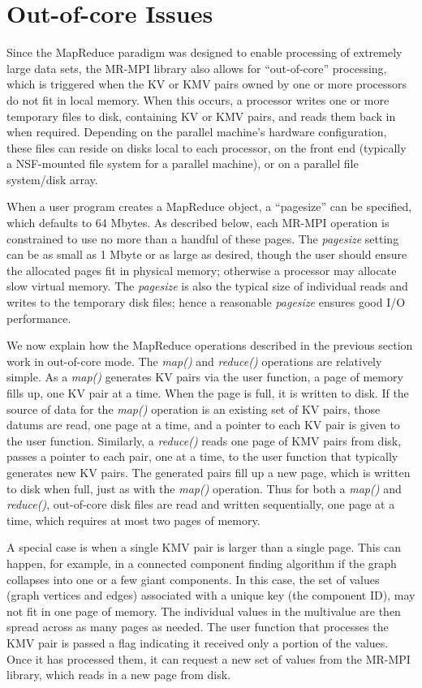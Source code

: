 \section{Out-of-core Issues}
\label{sec:outcore}

Since the MapReduce paradigm was designed to enable processing of
extremely large data sets, the MR-MPI library also allows for
``out-of-core'' processing, which is triggered when the KV or KMV
pairs owned by one or more processors do not fit in local memory.
When this occurs, a processor writes one or more temporary files to
disk, containing KV or KMV pairs, and reads them back in when
required.  Depending on the parallel machine's hardware configuration,
these files can reside on disks local to each processor, on the front
end (typically a NSF-mounted file system for a parallel machine), or
on a parallel file system/disk array.

When a user program creates a MapReduce object, a ``pagesize'' can be
specified, which defaults to 64 Mbytes.  As described below, each
MR-MPI operation is constrained to use no more than a handful of these
pages.  The {\it pagesize} setting can be as small as 1 Mbyte or as
large as desired, though the user should ensure the allocated pages
fit in physical memory; otherwise a processor may allocate slow
virtual memory.  The {\it pagesize} is also the typical size of
individual reads and writes to the temporary disk files; hence a
reasonable {\it pagesize} ensures good I/O performance.

We now explain how the MapReduce operations described in the previous
section work in out-of-core mode.  The {\it map()} and {\it reduce()}
operations are relatively simple.  As a {\it map()} generates KV pairs
via the user function, a page of memory fills up, one KV pair at a
time.  When the page is full, it is written to disk.  If the source of
data for the {\it map()} operation is an existing set of KV pairs,
those datums are read, one page at a time, and a pointer to
each KV pair is given to the user function.  Similarly, a {\it
reduce()} reads one page of KMV pairs from disk, passes a pointer
to each pair, one at a time, to the user function that typically generates
new KV pairs.  The generated pairs fill up a new page, which is
written to disk when full, just as with the {\it map()} operation.
Thus for both a {\it map()} and {\it reduce()}, out-of-core disk files
are read and written sequentially, one page at a time, which requires
at most two pages of memory.

A special case is when a single KMV pair is larger than a single page.
This can happen, for example, in a connected component finding
algorithm if the graph collapses into one or a few giant components.
In this case, the set of values (graph vertices and edges) associated
with a unique key (the component ID), may not fit in one page of
memory.  The individual values in the multivalue are then spread
across as many pages as needed.  The user function that processes the
KMV pair is passed a flag indicating it received only a portion of the
values.  Once it has processed them, it can request a new set of
values from the MR-MPI library, which reads in a new page from disk.


